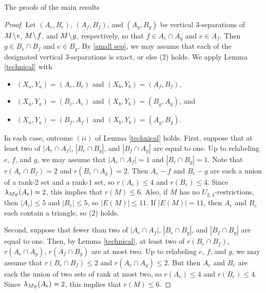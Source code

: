 \documentclass[12pt]{amsart}
\begin{document}
\begin{section}{The proofs of the main results}
\begin{proof}
Let $(A_e, B_e)$, $(A_f, B_f)$, and $(A_g, B_g)$ be vertical $3$-separations of $M \!\setminus\! e$, $M\!\setminus\! f$, and $M \!\setminus\! g$, respectively, so that $f \in A_e \cap A_g$ and $e \in A_f$.
Then $g \in B_e \cap B_f$ and $e \in B_g$.
By \ref{small sep}, we may assume that each of the designated vertical $3$-separations is exact, or else (2) holds.
We apply Lemma \ref{technical} with
\begin{itemize}
\item $(X_a, Y_a) = (A_e, B_e)$ and $(X_b, Y_b) = (A_f, B_f)$,

\item $(X_a, Y_a) = (B_e, A_e)$ and $(X_b, Y_b) = (B_g, A_g)$, and

\item $(X_a, Y_a) = (B_f, A_f)$ and $(X_b, Y_b) = (A_g, B_g)$.
\end{itemize}
In each case, outcome $(ii)$ of Lemma \ref{technical} holds.
First, suppose that at least two of $|A_e \cap A_f|$, $|B_e \cap B_g|$, and $|B_f \cap A_g|$ are equal to one.
Up to relabeling $e$, $f$, and $g$, we may assume that $|A_e \cap A_f| = 1$ and $|B_e \cap B_g| = 1$.
Note that $r(A_e \cap B_f) = 2$ and $r(B_e \cap A_g) = 2$.
Then $A_e - f$ and $B_e - g$ are each a union of a rank-$2$ set and a rank-$1$ set, so $r(A_e) \le 4$ and $r(B_e) \le 4$.
Since $\lambda_{M \!\setminus\! e}(A_e) = 2$, this implies that $r(M) \le 6$.
Also, if $M$ has no $U_{2,4}$-restrictions, then $|A_e| \le 5$ and $|B_e| \le 5$, so $|E(M)| \le 11$.
If $|E(M)| = 11$, then $A_e$ and $B_e$ each contain a triangle, so (2) holds.

Second, suppose that fewer than two of $|A_e \cap A_f|$, $|B_e \cap B_g|$, and $|B_f \cap B_g|$ are equal to one.
Then, by Lemma \ref{technical}, at least two of $r(B_e \cap B_f)$, $r(A_e \cap A_g)$, $r(A_f \cap B_g)$ are at most two.
Up to relabeling $e$, $f$, and $g$, we may assume that $r(B_e \cap B_f) \le 2$ and $r(A_e \cap A_g) \le 2$.
But then $A_e$ and $B_e$ are each the union of two sets of rank at most two, so $r(A_e) \le 4$ and $r(B_e) \le 4$. 
Since $\lambda_{M \!\setminus\! e}(A_e) = 2$, this implies that $r(M) \le 6$.


\end{proof}
\end{section}
\end{document}
